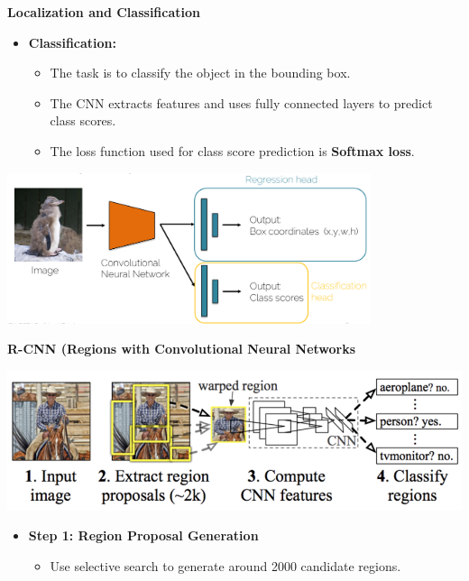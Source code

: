 \documentclass{beamer}
\begin{document}
\begin{frame}{\textbf{Localization and Classification}}
  \begin{itemize}

    \item \textbf{Classification:}
    \begin{itemize}
      \item The task is to classify the object in the bounding box.
      \item The CNN extracts features and uses fully connected layers to predict class scores.
      \item The loss function used for class score prediction is \textbf{Softmax loss}.
    \end{itemize}
  \end{itemize}

  \begin{center}
      \includegraphics[width=0.8\textwidth]{slide5.png}
  \end{center}
\end{frame}

\begin{frame}{\textbf{R-CNN (Regions with Convolutional Neural Networks}}
    \begin{center}
        \includegraphics[width=1\textwidth]{slide6.png} %
    \end{center}
    \begin{itemize}
        \item \textbf{Step 1: Region Proposal Generation}
        \begin{itemize}
            \item Use selective search to generate around 2000 candidate regions.
        \end{itemize}
    \end{itemize}

\end{frame}
\end{document}
